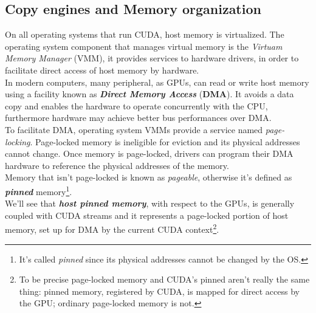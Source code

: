 \subsection{Copy engines and Memory organization}
On all operating systems that run CUDA, host memory is virtualized. The operating system component that manages virtual memory is the \textit{Virtuam Memory Manager} (VMM), it provides services to hardware drivers, in order to facilitate direct access of host memory by hardware.\\
In modern computers, many peripheral, as GPUs, can read or write host memory using a facility known as \textbf{\textit{Direct Memory Access}} (\textbf{DMA}). It avoids a data copy and enables the hardware to operate concurrently with the CPU, furthermore hardware may achieve better bus performances over DMA.\\
To facilitate DMA, operating system VMMs provide a service named \textit{page-locking}. Page-locked memory is ineligible for eviction and its physical addresses cannot change. Once memory is page-locked, drivers can program their DMA hardware to reference the physical addresses of the memory.\\
Memory that isn't page-locked is known as \textit{pageable}, otherwise it's defined as \textbf{\textit{pinned}} memory\footnote{It's called \textit{pinned} since its physical addresses cannot be changed by the OS.}.\\
We'll see that \textbf{\textit{host pinned memory}}, with respect to the GPUs, is generally coupled with CUDA streams and it represents a page-locked portion of host memory, set up for DMA by the current CUDA context\footnote{To be precise page-locked memory and CUDA's pinned aren't really the same thing: pinned memory, registered by CUDA, is mapped for direct access by the GPU; ordinary page-locked memory is not.}.\\

